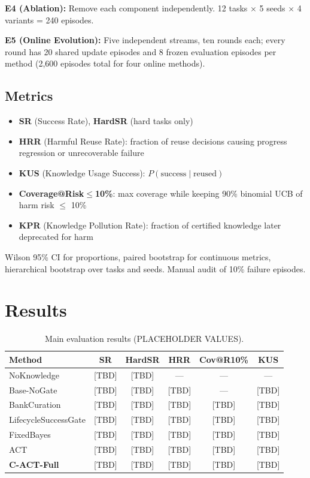 \documentclass[letterpaper]{article}
\begin{document}
\textbf{E4 (Ablation):} Remove each component independently. 12 tasks $\times$ 5 seeds $\times$ 4 variants = 240 episodes.

\textbf{E5 (Online Evolution):} Five independent streams, ten rounds each; every round has 20 shared update episodes and 8 frozen evaluation episodes per method (2,600 episodes total for four online methods).

\subsection{Metrics}

\begin{itemize}
    \item \textbf{SR} (Success Rate), \textbf{HardSR} (hard tasks only)
    \item \textbf{HRR} (Harmful Reuse Rate): fraction of reuse decisions causing progress regression or unrecoverable failure
    \item \textbf{KUS} (Knowledge Usage Success): $P(\text{success} \mid \text{reused})$
    \item \textbf{Coverage@Risk$\le$10\%}: max coverage while keeping 90\% binomial UCB of harm risk $\le$ 10\%
    \item \textbf{KPR} (Knowledge Pollution Rate): fraction of certified knowledge later deprecated for harm
\end{itemize}

Wilson 95\% CI for proportions, paired bootstrap for continuous metrics, hierarchical bootstrap over tasks and seeds. Manual audit of 10\% failure episodes.

\section{Results}


\begin{table}[t]
\centering
\caption{Main evaluation results (PLACEHOLDER VALUES).}
\label{tab:main}
\begin{tabular}{lccccc}
\toprule
\textbf{Method} & \textbf{SR} & \textbf{HardSR} & \textbf{HRR} & \textbf{Cov@R10\%} & \textbf{KUS} \\
\midrule
NoKnowledge         & [TBD] & [TBD] & ---   & ---   & ---   \\
Base-NoGate         & [TBD] & [TBD] & [TBD] & ---   & [TBD] \\
BankCuration        & [TBD] & [TBD] & [TBD] & [TBD] & [TBD] \\
LifecycleSuccessGate& [TBD] & [TBD] & [TBD] & [TBD] & [TBD] \\
FixedBayes          & [TBD] & [TBD] & [TBD] & [TBD] & [TBD] \\
ACT                 & [TBD] & [TBD] & [TBD] & [TBD] & [TBD] \\
\textbf{C-ACT-Full} & [TBD] & [TBD] & [TBD] & [TBD] & [TBD] \\
\bottomrule
\end{tabular}
\end{table}
\end{document}

